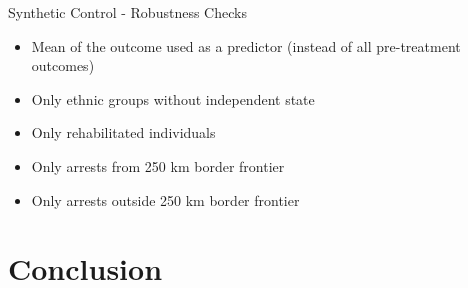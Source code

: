 \documentclass[11pt]{beamer}
\begin{document}
\begin{frame}[label=sc_robustness_checks]{Synthetic Control - Robustness Checks}
 \begin{itemize}
    \item Mean of the outcome used as a predictor (instead of all pre-treatment outcomes) \hyperlink{sc_mean}{}
        \item Only ethnic groups without independent state \hyperlink{sc_without_ind_state}{}
        \item Only rehabilitated individuals \hyperlink{sc_rehabs}{}
        \item Only arrests from 250 km border frontier \hyperlink{sc_border_area}{}
        \item Only arrests outside 250 km border frontier \hyperlink{sc_non_border_area}{}
    \end{itemize}
\end{frame}


\section{Conclusion}
\end{document}
